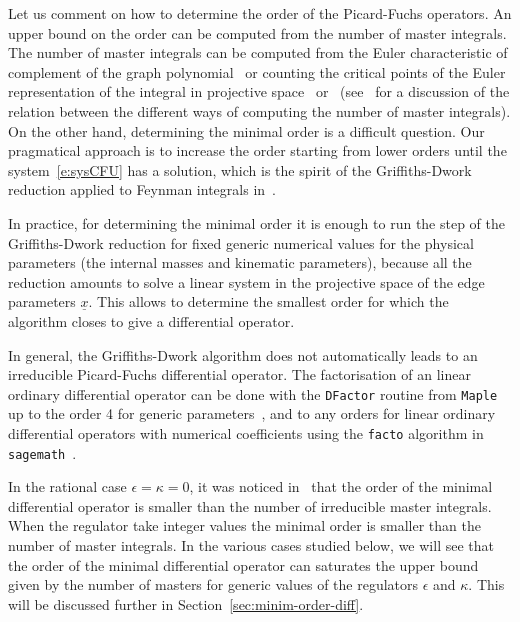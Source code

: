 \documentclass[a4paper,12pt]{article}
\numberwithin{equation}{section}
\numberwithin{figure}{section}
\begin{document}
\medskip
 
 Let us comment on how to determine the order of the Picard-Fuchs operators. An upper bound on the order can be computed
 from the number of master integrals.
 The number of master
integrals  can be computed from the Euler
characteristic of complement of the graph polynomial~\cite{Bitoun:2017nre} or counting the
critical points of the Euler representation of the integral in
projective
space~\cite{Lee:2013hzt,Cacciatori:2021nli}
or~\cite{Mastrolia:2018uzb,Frellesvig:2019uqt} (see~\cite{Agostini:2022cgv} for
a discussion of the relation between the different ways of computing the number of master
integrals). On the other hand, determining the minimal order is a
difficult question. Our pragmatical approach is to increase the order
starting from 
lower orders until the system~\eqref{e:sysCFU} has a solution, which is
the spirit of the Griffiths-Dwork reduction applied to Feynman
integrals in~\cite{Muller-Stach:2011qkg}.

In practice, for determining the minimal order it is enough to run the step of the
Griffiths-Dwork reduction for fixed generic numerical values for the physical
parameters (the internal masses and kinematic
parameters), because all the reduction amounts to solve a linear system in the projective space of
the edge parameters $\underline x$. This allows to determine the smallest order for which the
algorithm closes to give a differential operator.

In general, the Griffiths-Dwork algorithm does not automatically
leads to an irreducible Picard-Fuchs differential operator.
The factorisation of an linear ordinary
differential operator can be done with the {\tt DFactor} routine from
{\tt Maple} up to the order 4 for generic parameters~\cite{PutSinger,vanHoeij}, and to any
orders for linear  ordinary
differential operators with numerical coefficients
using the {\tt facto} algorithm in {\tt
	sagemath}~\cite{chyzak2022symbolic,goyer2021sage}.


 In the rational case $\epsilon=\kappa=0$, it was noticed
in~\cite{Bloch:2013tra,Bloch:2016izu,Bloch:2014qca,Lairez:2022zkj} that the order of the minimal differential operator is
smaller than the number of irreducible master integrals.
When the regulator take integer values the minimal order is smaller
than the number of master integrals. 
In the various cases studied below,
we will see that the order of the minimal differential operator can saturates
the upper bound given by the number of masters for generic values of
the regulators  $\epsilon$  and $\kappa$. 
This will
      be discussed further in Section~\ref{sec:minim-order-diff}.
\end{document}
